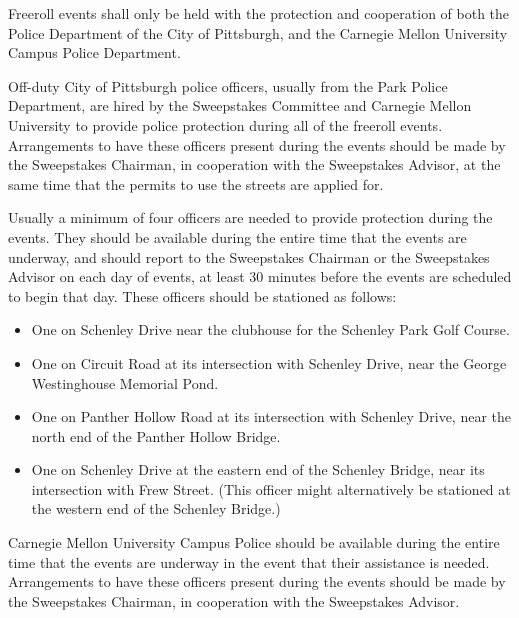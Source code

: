 	Freeroll events shall only be held with the protection and cooperation of
	both the Police Department of the City of Pittsburgh, and the Carnegie Mellon
	University Campus Police Department.

	Off-duty City of Pittsburgh police officers, usually from the Park Police
	Department, are hired by the Sweepstakes Committee and Carnegie Mellon
	University to provide police protection during all of the freeroll events.
	Arrangements to have these officers present during the events should be made by
	the Sweepstakes Chairman, in cooperation with the Sweepstakes Advisor, at the
	same time that the permits to use the streets are applied for.

	Usually a minimum of four officers are needed to provide protection during the
	events. They should be available during the entire time that the events are
	underway, and should report to the Sweepstakes Chairman or the Sweepstakes
	Advisor on each day of events, at least 30 minutes before the events are
	scheduled to begin that day. These officers should be stationed as follows:

	\begin{itemize}

		\item One on Schenley Drive near the clubhouse for the Schenley Park Golf
		Course.

		\item One on Circuit Road at its intersection with Schenley Drive, near the
		George Westinghouse Memorial Pond.

		\item One on Panther Hollow Road at its intersection with Schenley Drive,
		near the north end of the Panther Hollow Bridge.

		\item One on Schenley Drive at the eastern end of the Schenley Bridge, near
		its intersection with Frew Street. (This officer might alternatively be
		stationed at the western end of the Schenley Bridge.)

	\end{itemize}

	Carnegie Mellon University Campus Police should be available during the entire
	time that the events are underway in the event that their assistance is needed.
	Arrangements to have these officers present during the events should be made by
	the Sweepstakes Chairman, in cooperation with the Sweepstakes Advisor.


